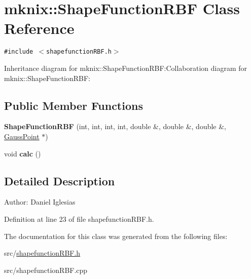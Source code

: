 \hypertarget{classmknix_1_1ShapeFunctionRBF}{
\section{mknix::ShapeFunctionRBF Class Reference}
\label{classmknix_1_1ShapeFunctionRBF}
}
{\tt \#include $<$shapefunctionRBF.h$>$}

Inheritance diagram for mknix::ShapeFunctionRBF:Collaboration diagram for mknix::ShapeFunctionRBF:\subsection*{Public Member Functions}
\begin{CompactItemize}
\item 
\hypertarget{classmknix_1_1ShapeFunctionRBF_79bd1396c1be6325a0f24e4c264be8e1}{
\textbf{ShapeFunctionRBF} (int, int, int, int, double \&, double \&, double \&, \hyperlink{classmknix_1_1GaussPoint}{GaussPoint} $\ast$)}
\label{classmknix_1_1ShapeFunctionRBF_79bd1396c1be6325a0f24e4c264be8e1}

\item 
\hypertarget{classmknix_1_1ShapeFunctionRBF_84441360824f4a8b754d0ae9f547c4ee}{
void \textbf{calc} ()}
\label{classmknix_1_1ShapeFunctionRBF_84441360824f4a8b754d0ae9f547c4ee}

\end{CompactItemize}


\subsection{Detailed Description}
\begin{Desc}
\item[Author:]Daniel Iglesias \end{Desc}


Definition at line 23 of file shapefunctionRBF.h.

The documentation for this class was generated from the following files:\begin{CompactItemize}
\item 
src/\hyperlink{shapefunctionRBF_8h}{shapefunctionRBF.h}\item 
src/shapefunctionRBF.cpp\end{CompactItemize}
